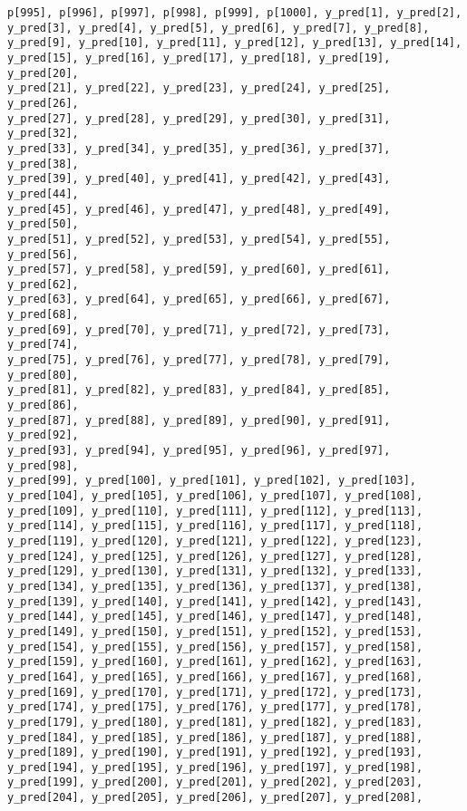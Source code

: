 \documentclass[
  letterpaper,
  DIV=11,
  numbers=noendperiod]{scrartcl}
\begin{document}
\begin{verbatim}
p[995], p[996], p[997], p[998], p[999], p[1000], y_pred[1], y_pred[2],
y_pred[3], y_pred[4], y_pred[5], y_pred[6], y_pred[7], y_pred[8],
y_pred[9], y_pred[10], y_pred[11], y_pred[12], y_pred[13], y_pred[14],
y_pred[15], y_pred[16], y_pred[17], y_pred[18], y_pred[19], y_pred[20],
y_pred[21], y_pred[22], y_pred[23], y_pred[24], y_pred[25], y_pred[26],
y_pred[27], y_pred[28], y_pred[29], y_pred[30], y_pred[31], y_pred[32],
y_pred[33], y_pred[34], y_pred[35], y_pred[36], y_pred[37], y_pred[38],
y_pred[39], y_pred[40], y_pred[41], y_pred[42], y_pred[43], y_pred[44],
y_pred[45], y_pred[46], y_pred[47], y_pred[48], y_pred[49], y_pred[50],
y_pred[51], y_pred[52], y_pred[53], y_pred[54], y_pred[55], y_pred[56],
y_pred[57], y_pred[58], y_pred[59], y_pred[60], y_pred[61], y_pred[62],
y_pred[63], y_pred[64], y_pred[65], y_pred[66], y_pred[67], y_pred[68],
y_pred[69], y_pred[70], y_pred[71], y_pred[72], y_pred[73], y_pred[74],
y_pred[75], y_pred[76], y_pred[77], y_pred[78], y_pred[79], y_pred[80],
y_pred[81], y_pred[82], y_pred[83], y_pred[84], y_pred[85], y_pred[86],
y_pred[87], y_pred[88], y_pred[89], y_pred[90], y_pred[91], y_pred[92],
y_pred[93], y_pred[94], y_pred[95], y_pred[96], y_pred[97], y_pred[98],
y_pred[99], y_pred[100], y_pred[101], y_pred[102], y_pred[103],
y_pred[104], y_pred[105], y_pred[106], y_pred[107], y_pred[108],
y_pred[109], y_pred[110], y_pred[111], y_pred[112], y_pred[113],
y_pred[114], y_pred[115], y_pred[116], y_pred[117], y_pred[118],
y_pred[119], y_pred[120], y_pred[121], y_pred[122], y_pred[123],
y_pred[124], y_pred[125], y_pred[126], y_pred[127], y_pred[128],
y_pred[129], y_pred[130], y_pred[131], y_pred[132], y_pred[133],
y_pred[134], y_pred[135], y_pred[136], y_pred[137], y_pred[138],
y_pred[139], y_pred[140], y_pred[141], y_pred[142], y_pred[143],
y_pred[144], y_pred[145], y_pred[146], y_pred[147], y_pred[148],
y_pred[149], y_pred[150], y_pred[151], y_pred[152], y_pred[153],
y_pred[154], y_pred[155], y_pred[156], y_pred[157], y_pred[158],
y_pred[159], y_pred[160], y_pred[161], y_pred[162], y_pred[163],
y_pred[164], y_pred[165], y_pred[166], y_pred[167], y_pred[168],
y_pred[169], y_pred[170], y_pred[171], y_pred[172], y_pred[173],
y_pred[174], y_pred[175], y_pred[176], y_pred[177], y_pred[178],
y_pred[179], y_pred[180], y_pred[181], y_pred[182], y_pred[183],
y_pred[184], y_pred[185], y_pred[186], y_pred[187], y_pred[188],
y_pred[189], y_pred[190], y_pred[191], y_pred[192], y_pred[193],
y_pred[194], y_pred[195], y_pred[196], y_pred[197], y_pred[198],
y_pred[199], y_pred[200], y_pred[201], y_pred[202], y_pred[203],
y_pred[204], y_pred[205], y_pred[206], y_pred[207], y_pred[208],

\end{verbatim}
\end{document}
